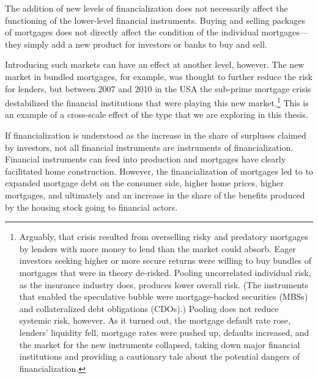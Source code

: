 The addition of new levels of financialization does not necessarily affect the functioning of the lower-level financial instruments. Buying and selling packages of mortgages does not directly affect the condition of the individual mortgages---they simply add a new product for investors or banks to buy and sell. 

Introducing such markets can have an effect at another level, however. The new market in bundled mortgages, for example, was thought to further reduce the risk for lenders, but between 2007 and 2010 in the USA the sub-prime mortgage crisis destabilized the financial institutions that were playing this new market.\footnote{Arguably, that crisis resulted from overselling risky and predatory mortgages by lenders with more money to lend than the market could absorb. Eager investors seeking higher or more secure returns were willing to buy bundles of mortgages that were in theory de-risked. Pooling uncorrelated individual risk, as the insurance industry does, produces lower overall risk. (The instruments that enabled the speculative bubble were mortgage-backed securities (MBSs) and collateralized debt obligations (CDOs).) Pooling does not reduce systemic risk, however. As it turned out, the mortgage default rate rose, lenders' liquidity fell, mortgage rates were pushed up, defaults increased, and the market for the new instruments collapsed, taking down major financial institutions and providing a cautionary tale about the potential dangers of financialization.} 
This is an example of a cross-scale effect of the type that we are exploring in this thesis.  



If financialization is understood as the increase in the share of surpluses claimed by investors, not all financial instruments are instruments of financialization. Financial instruments can feed into production and mortgages have clearly facilitated home construction. However, the financialization of mortgages led to to expanded mortgage debt on the consumer side, higher home prices, higher mortgages, and ultimately and an increase in the share of the benefits produced by the housing stock going to financial actors. 

